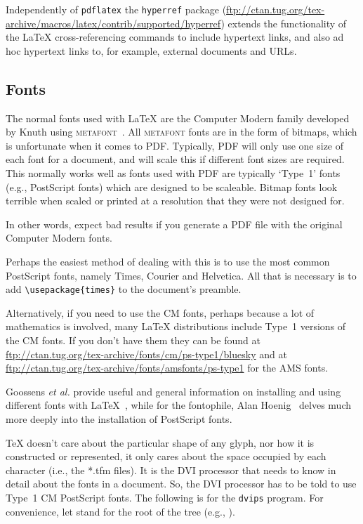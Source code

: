 \documentclass[11pt]{article}
\newcommand{\file}[1]{\textsf{#1}}
\newcommand{\program}[1]{\texttt{#1}}
\newcommand{\package}[1]{\texttt{#1}}
\newcommand{\mfont}{\textsc{metafont}}
\newcommand{\tex}{TeX}
\newcommand{\latex}{LaTeX}
\begin{document}
    Independently of \program{pdflatex} the \package{hyperref} package 
(\url{ftp://ctan.tug.org/tex-archive/macros/latex/contrib/supported/hyperref})
extends the functionality of the \latex{} cross-referencing commands to
include hypertext links, and also ad hoc hypertext links to, for example,
external documents and URLs.

\subsection{Fonts}

    The normal fonts used with \latex{} are the Computer Modern family 
developed by Knuth using \mfont~\cite{KNUTH86b}. 
All \mfont{} fonts are in the form of
bitmaps, which is unfortunate when it comes to PDF. Typically, PDF will
only use one size of each font for a document, and will scale this if 
different font sizes are required. This normally works well as fonts
used with PDF are typically `Type~1' fonts (e.g., PostScript fonts)
which are designed to be scaleable. Bitmap fonts look terrible when scaled
or printed at a resolution that they were not designed for.

    In other words, expect bad results if you generate a PDF file with
the original Computer Modern fonts.

    Perhaps the easiest method of dealing with this is to use the most common
PostScript fonts, namely Times, Courier and Helvetica. All that is
necessary is to add \verb|\usepackage{times}| to the document's preamble.

    Alternatively, if you need to use the CM fonts, perhaps because a lot
of mathematics is involved, many \latex{} distributions include
Type~1 versions of the CM fonts. If you don't have them they can be found at
\url{ftp://ctan.tug.org/tex-archive/fonts/cm/ps-type1/bluesky} and 
at \url{ftp://ctan.tug.org/tex-archive/fonts/amsfonts/ps-type1} for the AMS fonts.

    Goossens \textit{et al.} provide useful and general information
on installing and using different fonts with \latex~\cite{GOOSSENS94},
while for the fontophile, Alan Hoenig~\cite{HOENIG98} delves much 
more deeply into the installation of PostScript fonts.

    \tex{} doesn't care about the particular shape of any glyph, nor how it
is constructed or represented, it only cares about the space occupied by
each character (i.e., the \file{*.tfm} files). 
It is the DVI processor that needs to know in detail
about the fonts in a document. So, the DVI processor has to be told to
use Type~1 CM PostScript fonts.
The following is for the \program{dvips} program.
For convenience, let  stand for the root of the
 tree (e.g., ).
\end{document}

